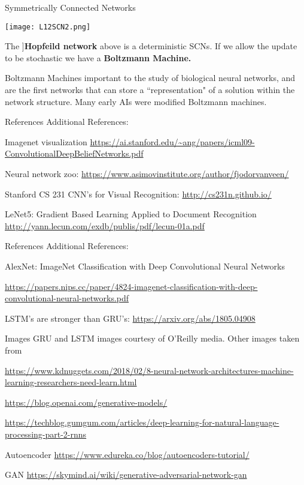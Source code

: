\documentclass[10pt, table, dvipsnames,xcdraw, handout]{beamer}
\begin{document}
\begin{frame}[fragile]{Symmetrically Connected Networks}
  \begin{minipage}[t][0.5\textheight][t]{\textwidth}
	\centering \texttt{[image: L12SCN2.png]} 
  \end{minipage}
  \vfill
\begin{minipage}[t][0.5\textheight][t]{\textwidth}
The ]\textbf{Hopfeild network} above is a deterministic SCNs. If we allow the update to be stochastic we have a \textbf{Boltzmann Machine.} \pause

Boltzmann Machines important to the study of biological neural networks, and are the first networks that can store a ``representation" of a solution within the network structure. Many early AIs were modified Boltzmann machines. 
\end{minipage}
\end{frame}






\begin{frame}[fragile]{References}
Additional References:

Imagenet visualization
\url{https://ai.stanford.edu/~ang/papers/icml09-ConvolutionalDeepBeliefNetworks.pdf}

Neural network zoo: \url{https://www.asimovinstitute.org/author/fjodorvanveen/}

Stanford CS 231 CNN's for Visual Recognition: \url{http://cs231n.github.io/}

LeNet5: Gradient Based Learning Applied to Document Recognition \url{http://yann.lecun.com/exdb/publis/pdf/lecun-01a.pdf}

\end{frame}


\begin{frame}[fragile]{References}
Additional References:

AlexNet: ImageNet Classification with Deep Convolutional Neural Networks 

\url{https://papers.nips.cc/paper/4824-imagenet-classification-with-deep-convolutional-neural-networks.pdf}

LSTM's are stronger than GRU's: \url{https://arxiv.org/abs/1805.04908}
\end{frame}


\begin{frame}[fragile]{Images}
GRU and LSTM images courtesy of O'Reilly media. Other images taken from

\url{https://www.kdnuggets.com/2018/02/8-neural-network-architectures-machine-learning-researchers-need-learn.html}

\url{https://blog.openai.com/generative-models/}

\url{https://techblog.gumgum.com/articles/deep-learning-for-natural-language-processing-part-2-rnns}


Autoencoder
\url{https://www.edureka.co/blog/autoencoders-tutorial/}

GAN
\url{https://skymind.ai/wiki/generative-adversarial-network-gan}
\end{frame}
\end{document}
